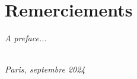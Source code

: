 \chapter*{Remerciements}

\emph{A preface...}

\begin{flushright}
{\makeatletter\itshape
    \@author \\
    Paris, septembre 2024
\makeatother}
\end{flushright}
